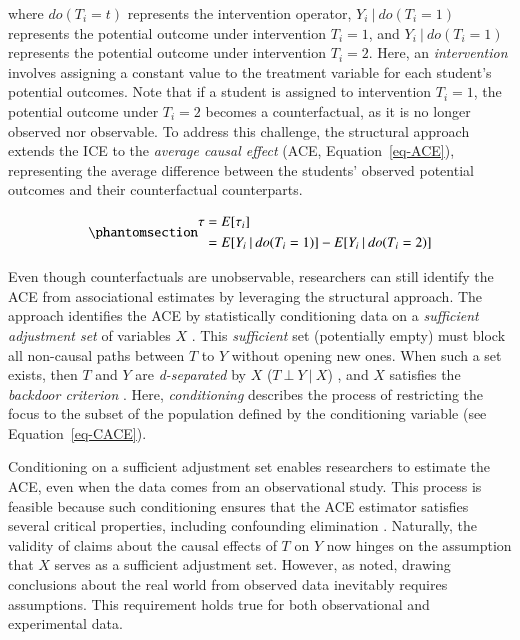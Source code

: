 \documentclass[
  authoryear,
  review,
  1p]{elsarticle}
\begin{document}
where \(do(T_{i}=t)\) represents the intervention operator,
\(Y_{i} \:|\:do(T_{i}=1)\) represents the potential outcome under
intervention \(T_{i}=1\), and \(Y_{i} \:|\:do(T_{i}=1)\) represents the
potential outcome under intervention \(T_{i}=2\). Here, an
\emph{intervention} involves assigning a constant value to the treatment
variable for each student's potential outcomes. Note that if a student
is assigned to intervention \(T_{i}=1\), the potential outcome under
\(T_{i}=2\) becomes a counterfactual, as it is no longer observed nor
observable. To address this challenge, the structural approach extends
the ICE to the \emph{average causal effect} (ACE,
Equation~\ref{eq-ACE}), representing the average difference between the
students' observed potential outcomes and their counterfactual
counterparts.

\begin{equation}\phantomsection\label{eq-ACE}{
\begin{aligned}
\tau & = E[\tau_{i}] \\
  & = E[Y_{i} \:|\:do(T_{i}=1)]- E[Y_{i} \:|\:do(T_{i}=2)]
\end{aligned}
}\end{equation}

Even though counterfactuals are unobservable, researchers can still
identify the ACE from associational estimates by leveraging the
structural approach. The approach identifies the ACE by statistically
conditioning data on a \emph{sufficient adjustment set} of variables
\(X\) \citep{Pearl_2009, Pearl_et_al_2016, Morgan_et_al_2014}. This
\emph{sufficient} set (potentially empty) must block all non-causal
paths between \(T\) to \(Y\) without opening new ones. When such a set
exists, then \(T\) and \(Y\) are \emph{d-separated} by \(X\)
(\(T \:\bot\:Y \:|\:X\)) \citep{Pearl_2009}, and \(X\) satisfies the
\emph{backdoor criterion} \citep[pp 37]{Neal_2020}. Here,
\emph{conditioning} describes the process of restricting the focus to
the subset of the population defined by the conditioning variable
\citep[pp.~32]{Neal_2020} (see Equation~\ref{eq-CACE}).

Conditioning on a sufficient adjustment set enables researchers to
estimate the ACE, even when the data comes from an observational study.
This process is feasible because such conditioning ensures that the ACE
estimator satisfies several critical properties, including confounding
elimination \citep{Morgan_et_al_2014}. Naturally, the validity of claims
about the causal effects of \(T\) on \(Y\) now hinges on the assumption
that \(X\) serves as a sufficient adjustment set. However, as
\citet[pp.~150]{Kohler_et_al_2019} noted, drawing conclusions about the
real world from observed data inevitably requires assumptions. This
requirement holds true for both observational and experimental data.
\end{document}
